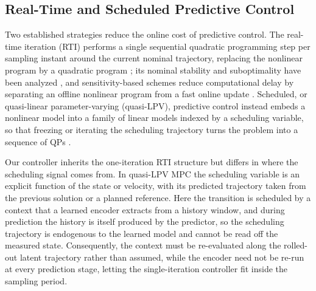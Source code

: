\subsection{Real-Time and Scheduled Predictive Control}

Two established strategies reduce the online cost of predictive control. The real-time iteration (RTI) performs a single sequential quadratic programming step per sampling instant around the current nominal trajectory, replacing the nonlinear program by a quadratic program \cite{diehl2005realtime, gros2020rti}; its nominal stability and suboptimality have been analyzed \cite{diehl2005rtistability}, and sensitivity-based schemes reduce computational delay by separating an offline nonlinear program from a fast online update \cite{zavala2009advancedstep}. Scheduled, or quasi-linear parameter-varying (quasi-LPV), predictive control instead embeds a nonlinear model into a family of linear models indexed by a scheduling variable, so that freezing or iterating the scheduling trajectory turns the problem into a sequence of QPs \cite{rugh2000gain, leith1998velocity, cisneros2016qlmpc, cisneros2020qlpv}.

Our controller inherits the one-iteration RTI structure but differs in where the scheduling signal comes from. In quasi-LPV MPC the scheduling variable is an explicit function of the state or velocity, with its predicted trajectory taken from the previous solution or a planned reference. Here the transition is scheduled by a context that a learned encoder extracts from a history window, and during prediction the history is itself produced by the predictor, so the scheduling trajectory is endogenous to the learned model and cannot be read off the measured state. Consequently, the context must be re-evaluated along the rolled-out latent trajectory rather than assumed, while the encoder need not be re-run at every prediction stage, letting the single-iteration controller fit inside the sampling period.
